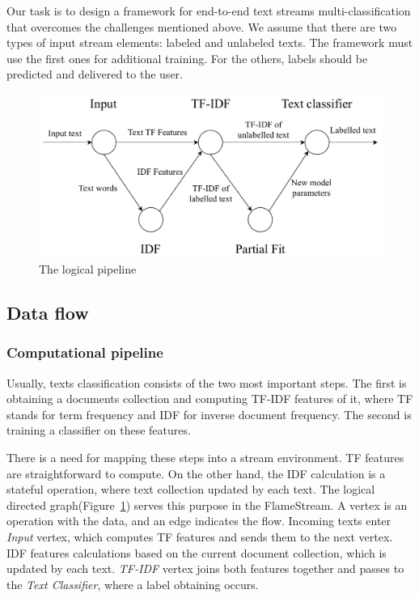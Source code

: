 \label{fs-framework}

Our task is to design a framework for end-to-end text streams multi-classification that overcomes the challenges mentioned above. We assume that there are two types of input stream elements: labeled and unlabeled texts. The framework must use the first ones for additional training. For the others, labels should be predicted and delivered to the user.

\begin{figure}[htbp]
  \centering
  \includegraphics[scale=0.48]{pics/logical-graph}
  \caption{The logical pipeline}
  \label {logical_graph}
\end{figure}

\subsection{Data flow \label{DF}}

\subsubsection{Computational pipeline}

Usually, texts classification consists of the two most important steps. The first is obtaining a documents collection and computing TF-IDF features of it, where TF stands for term frequency and IDF for inverse document frequency. The second is training a classifier on these features.

There is a need for mapping these steps into a stream environment. TF features are straightforward to compute. On the other hand, the IDF calculation is a stateful operation, where text collection updated by each text. The logical directed graph(Figure~\ref{logical_graph}) serves this purpose in the FlameStream. A vertex is an operation with the data, and an edge indicates the flow. Incoming texts enter {\em Input} vertex, which computes TF features and sends them to the next vertex. IDF features calculations based on the current document collection, which is updated by each text. {\em TF-IDF} vertex joins both features together and passes to the {\em Text Classifier}, where a label obtaining occurs.

